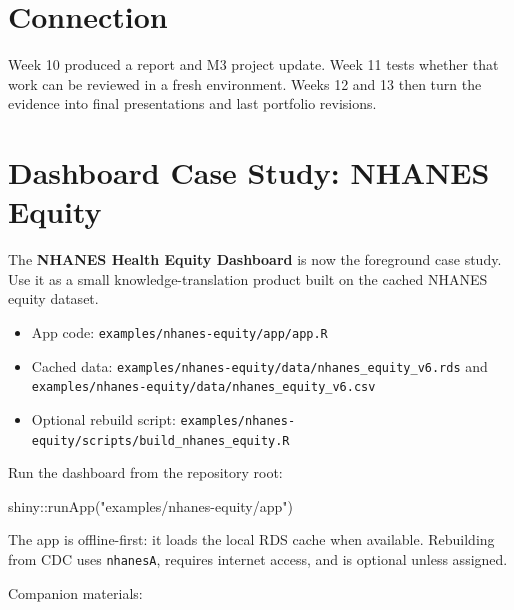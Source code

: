 \documentclass[
  letterpaper,
  DIV=11,
  numbers=noendperiod,
  oneside]{scrreprt}
\newenvironment{Shaded}{\begin{snugshade}}{\end{snugshade}}
\newcommand{\FunctionTok}[1]{\textcolor[rgb]{0.28,0.35,0.67}{#1}}
\newcommand{\NormalTok}[1]{\textcolor[rgb]{0.00,0.23,0.31}{#1}}
\newcommand{\SpecialCharTok}[1]{\textcolor[rgb]{0.37,0.37,0.37}{#1}}
\newcommand{\StringTok}[1]{\textcolor[rgb]{0.13,0.47,0.30}{#1}}
\providecommand{\tightlist}{%
  \setlength{\itemsep}{0pt}\setlength{\parskip}{0pt}}
\begin{document}
\section*{Connection}\label{connection-10}


Week 10 produced a report and M3 project update. Week 11 tests whether
that work can be reviewed in a fresh environment. Weeks 12 and 13 then
turn the evidence into final presentations and last portfolio revisions.

\section*{Dashboard Case Study: NHANES
Equity}\label{dashboard-case-study-nhanes-equity-3}


The \textbf{NHANES Health Equity Dashboard} is now the foreground case
study. Use it as a small knowledge-translation product built on the
cached NHANES equity dataset.

\begin{itemize}
\tightlist
\item
  App code: \texttt{examples/nhanes-equity/app/app.R}
\item
  Cached data:
  \texttt{examples/nhanes-equity/data/nhanes\_equity\_v6.rds} and
  \texttt{examples/nhanes-equity/data/nhanes\_equity\_v6.csv}
\item
  Optional rebuild script:
  \texttt{examples/nhanes-equity/scripts/build\_nhanes\_equity.R}
\end{itemize}

Run the dashboard from the repository root:

\begin{Shaded}
\begin{Highlighting}[numbers=left,,]
\NormalTok{shiny}\SpecialCharTok{::}\FunctionTok{runApp}\NormalTok{(}\StringTok{"examples/nhanes{-}equity/app"}\NormalTok{)}
\end{Highlighting}
\end{Shaded}

The app is offline-first: it loads the local RDS cache when available.
Rebuilding from CDC uses \texttt{nhanesA}, requires internet access, and
is optional unless assigned.

Companion materials:
\end{document}
